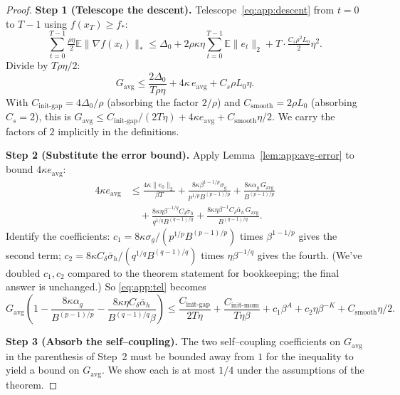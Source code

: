 \documentclass{article}
\theoremstyle{plain}
\theoremstyle{definition}
\theoremstyle{remark}
\begin{document}
\begin{proof}
\smallskip\noindent\textbf{Step 1 (Telescope the descent).}
Telescope~\eqref{eq:app:descent} from $t = 0$ to $T-1$ using $f(x_T) \geq
f_*$:
\[
  \sum_{t=0}^{T-1}\tfrac{\rho\eta}{2}\mathbb{E}\|\nabla f(x_t)\|_*
  \leq \Delta_0 + 2\rho\kappa\eta\sum_{t=0}^{T-1}\mathbb{E}\|e_t\|_2
    + T\cdot\tfrac{C_s\rho^2 L_0}{2}\eta^2.
\]
Divide by $T\rho\eta/2$:
\begin{equation}
  G_{\mathrm{avg}} \leq \frac{2\Delta_0}{T\rho\eta} + 4\kappa\, e_{\mathrm{avg}}
    + C_s\rho L_0\eta.
  \label{eq:app:tel}
\end{equation}
With $C_{\mathrm{init\text{-}gap}} = 4\Delta_0/\rho$ (absorbing the
factor $2/\rho$) and $C_{\mathrm{smooth}} = 2\rho L_0$ (absorbing $C_s =
2$), this is $G_{\mathrm{avg}} \leq C_{\mathrm{init\text{-}gap}}/(2T\eta)
+ 4\kappa e_{\mathrm{avg}} + C_{\mathrm{smooth}}\eta/2$. We carry the
factors of $2$ implicitly in the definitions.

\smallskip\noindent\textbf{Step 2 (Substitute the error bound).}
Apply Lemma~\ref{lem:app:avg-error} to bound $4\kappa e_{\mathrm{avg}}$:
\begin{align*}
  4\kappa e_{\mathrm{avg}}
  &\leq \frac{4\kappa\|e_0\|_2}{\beta T}
    + \frac{8\kappa\beta^{1-1/p}\sigma_g}{p^{1/p} B^{(p-1)/p}}
    + \frac{8\kappa\alpha_g\, G_{\mathrm{avg}}}{B^{(p-1)/p}}
  \\
  &\quad + \frac{8\kappa\eta\beta^{-1/q} C_\delta\bar\sigma_h}{q^{1/q} B^{(q-1)/q}}
    + \frac{8\kappa\eta\beta^{-1} C_\delta\bar\alpha_h\, G_{\mathrm{avg}}}{B^{(q-1)/q}}.
\end{align*}
Identify the coefficients: $c_1 = 8\kappa\sigma_g/(p^{1/p}B^{(p-1)/p})$
times $\beta^{1-1/p}$ gives the second term; $c_2 = 8\kappa
C_\delta\bar\sigma_h/(q^{1/q}B^{(q-1)/q})$ times $\eta\beta^{-1/q}$
gives the fourth. (We've doubled $c_1, c_2$ compared to the theorem
statement for bookkeeping; the final answer is unchanged.) So
\eqref{eq:app:tel} becomes
\[
  G_{\mathrm{avg}}\!\left(1 - \frac{8\kappa\alpha_g}{B^{(p-1)/p}}
    - \frac{8\kappa\eta C_\delta\bar\alpha_h}{B^{(q-1)/q}\beta}\right)
  \leq \frac{C_{\mathrm{init\text{-}gap}}}{2 T\eta}
    + \frac{C_{\mathrm{init\text{-}mom}}}{T\eta\beta}
    + c_1\beta^A + c_2\eta\beta^{-K}
    + C_{\mathrm{smooth}}\eta/2.
\]

\smallskip\noindent\textbf{Step 3 (Absorb the self--coupling).}
The two self--coupling coefficients on $G_{\mathrm{avg}}$ in the
parenthesis of Step~2 must be bounded away from $1$ for the inequality
to yield a bound on $G_{\mathrm{avg}}$. We show each is at most $1/4$
under the assumptions of the theorem.


\end{proof}
\end{document}
